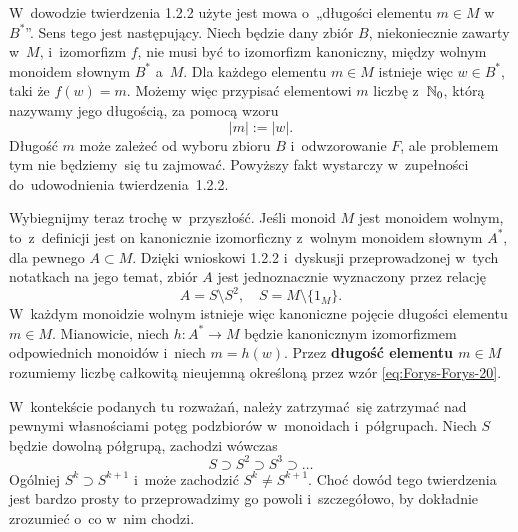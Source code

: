 \documentclass[a4paper,11pt]{article}
\begin{document}
\vspace{\spaceFour}





\start {} W~dowodzie twierdzenia 1.2.2 użyte jest mowa
o~„długości elementu $m \in M$ w~$B^{ * }$”. Sens tego jest
następujący. Niech będzie dany zbiór $B$, niekoniecznie zawarty w~$M$,
i~izomorfizm $f$, nie musi być to izomorfizm kanoniczny, między wolnym
monoidem słownym $B^{ * }$ a~$M$. Dla każdego elementu $m \in M$
istnieje więc $w \in B^{ * }$, taki że $f( w ) = m$. Możemy więc
przypisać elementowi $m$ liczbę z~$\mathbb{N}_{ 0 }$, którą nazywamy jego
długością, za pomocą wzoru
\begin{equation}
  \label{eq:Forys-Forys-24}
  | m | := | w |.
\end{equation}
Długość $m$ może zależeć od wyboru zbioru $B$ i~odwzorowanie $F$, ale
problemem tym nie będziemy~się tu zajmować. Powyższy fakt wystarczy
w~zupełności do~udowodnienia twierdzenia~1.2.2.

Wybiegnijmy teraz trochę w~przyszłość. Jeśli monoid $M$ jest monoidem
wolnym, to~z~definicji jest on kanonicznie izomorficzny z~wolnym
monoidem słownym $A^{ * }$, dla pewnego $A \subset M$. Dzięki
wnioskowi 1.2.2 i~dyskusji przeprowadzonej w~tych notatkach na jego
temat, zbiór $A$ jest jednoznacznie wyznaczony przez relację
\begin{equation}
  \label{eq:Forys-Forys-25}
  A = S \setminus S^{ 2 }, \quad
  S = M \setminus \{ 1_{ M } \}.
\end{equation}
W~każdym monoidzie wolnym istnieje więc kanoniczne pojęcie długości
elementu $m \in M$. Mianowicie, niech $h : A^{ * } \to M$ będzie
kanonicznym izomorfizmem odpowiednich monoidów i~niech $m = h( w )$.
Przez \textbf{długość elementu $m \in M$} rozumiemy liczbę całkowitą
nieujemną określoną przez wzór \eqref{eq:Forys-Forys-20}.

\vspace{\spaceFour}





\start {} W~kontekście podanych tu rozważań, należy
zatrzymać~się zatrzymać nad pewnymi własnościami potęg podzbiorów
w~monoidach i~półgrupach. Niech $S$ będzie dowolną półgrupą, zachodzi
wówczas
\begin{equation}
  \label{eq:Forys-Forys-26}
  S \supset S^{ 2 } \supset S^{ 3 } \supset \ldots
\end{equation}
Ogólniej $S^{ k } \supset S^{ k + 1 }$ i~może zachodzić
$S^{ k } \neq S^{ k + 1 }$. Choć dowód tego twierdzenia jest bardzo
prosty to przeprowadzimy go powoli i~szczegółowo, by dokładnie
zrozumieć o~co w~nim chodzi.
\end{document}

